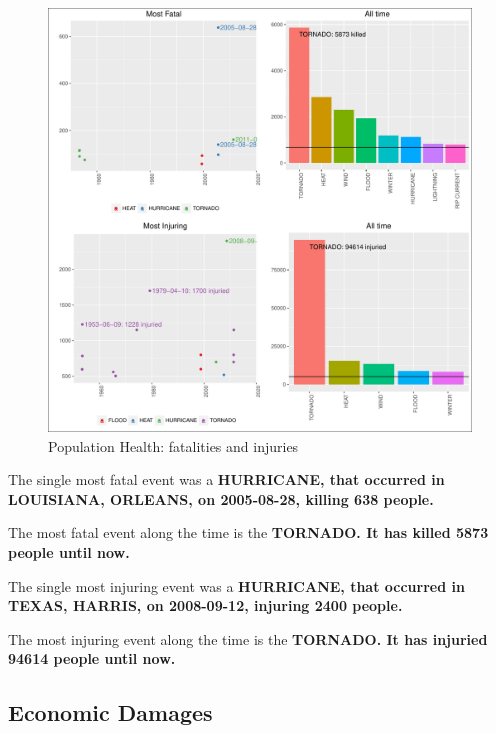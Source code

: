 \documentclass[]{article}
\begin{document}
\begin{figure}[htbp]
\centering
\includegraphics{readme_files/figure-latex/health-plot-1.pdf}
\caption{Population Health: fatalities and injuries}
\end{figure}

The single most fatal event was a \textbf{HURRICANE, that occurred in
LOUISIANA, ORLEANS, on 2005-08-28, killing 638 people.}

The most fatal event along the time is the \textbf{TORNADO. It has
killed 5873 people until now.}

The single most injuring event was a \textbf{HURRICANE, that occurred in
TEXAS, HARRIS, on 2008-09-12, injuring 2400 people.}

The most injuring event along the time is the \textbf{TORNADO. It has
injuried 94614 people until now.}

\subsection{Economic Damages}\label{economic-damages}
\end{document}
